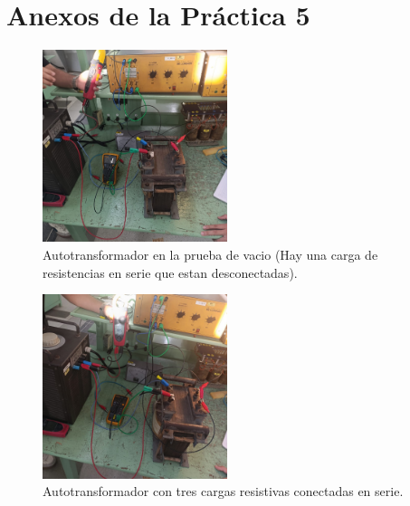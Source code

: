 \section{Anexos de la Práctica 5}
\begin{figure}[ht!] %
    \centering
    \includegraphics[width=0.48\textwidth]{fot/prac4_autoenvacio.jpeg} %
    \caption{Autotransformador en la prueba de vacio (Hay una carga de resistencias en serie que estan desconectadas).}
    \label{fig:prac4_autoenvacio}
\end{figure}

\begin{figure}[ht!] %
    \centering
    \includegraphics[width=0.48\textwidth]{fot/prac4_autoR_.jpeg} %
    \caption{Autotransformador con tres cargas resistivas conectadas en serie.}
    \label{fig:AutoR1}
\end{figure}